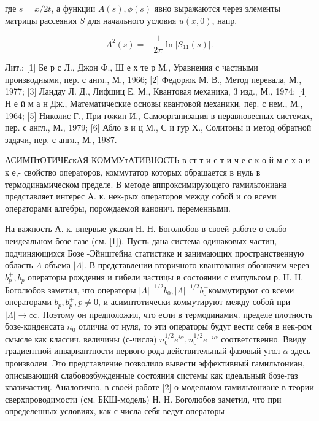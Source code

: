 \documentclass[10pt]{article}
\begin{document}
где $s=x / 2 t$, а функции $A(s), \phi(s)$ явно выражаются через элементы матрицы рассеяния $S$ для начального условия $u(x, 0)$, напр.



\[

A^{2}(s)=-\frac{1}{2 \pi} \ln \left|S_{11}(s)\right| .

\]



Лит.: [1] Бе р с Л., Джон Ф., Ш е х те р М., Уравнения с частными производными, пер. с англ., М., 1966; [2] Федорюк М. В., Метод перевала, М., 1977; [3] Ландау Л. Д., Лифшиц Е. М., Квантовая механика, 3 изд., М., 1974; [4] Н е й м а н Дж., Математические основы квантовой механики, пер. с нем., М., 1964; [5] Николис Г., При гожин И., Самоорганизация в неравновесных системах, пер. с англ., М., 1979; [6] Абло в и ц М., С и гур Х., Солитоны и метод обратной задачи, пер. с англ., М., 1987.



АСИМПтОТИЧЕскАЯ КОММУтАТИВНОСТЬ в ст т и с т и ч е с к о й м е х а и к е,- свойство операторов, коммутатор которых обрашается в нуль в термодинамическом пределе. В методе аппроксимирующего гамильтониана представляет интерес А. к. нек-рых операторов между собой и со всеми операторами алгебры, порождаемой канонич. переменными.



На важность А. к. впервые указал Н. Н. Боголюбов в своей работе о слабо неидеальном бозе-газе (см. [1]). Пусть дана система одинаковых частиц, подчиняющихся Бозе -Эйнштейна статистике и занимающих пространственную область $\Lambda$ объема $|\Lambda|$. В представлении вторичного квантования обозначим через $b_{p}^{+}, b_{p}$ операторы рождения и гибели частицы в состоянии с импульсом р. Н. Н. Боголюбов заметил, что операторы $|\Lambda|^{-1 / 2} b_{0},|\Lambda|^{-1 / 2} b_{0}^{+}$коммутируют со всеми операторами $b_{p}, b_{p}^{+}, p \neq 0$, и асимптотически коммутируют между собой при $|\Lambda| \rightarrow \infty$. Поэтому он предположил, что если в термодинамич. пределе плотность бозе-конденсата $n_{0}$ отлична от нуля, то эти операторы будут вести себя в нек-ром смысле как классич. величины (с-числа) $n_{0}^{1 / 2} e^{i \alpha}, n_{0}^{1 / 2} e^{-i \alpha}$ соответственно. Ввиду градиентной инвариантности первого рода действительный фазовый угол $\alpha$ здесь произволен. Это представление позволило вывести эффективный гамильтониан, описывающий слабовозбужденные состояния системы как идеальный бозе-газ квазичастиц. Аналогично, в своей работе [2] о модельном гамильтониане в теории сверхпроводимости (см. БКШ-модель) Н. Н. Боголюбов заметил, что при определенных условиях, как с-числа себя ведут операторы
\end{document}
